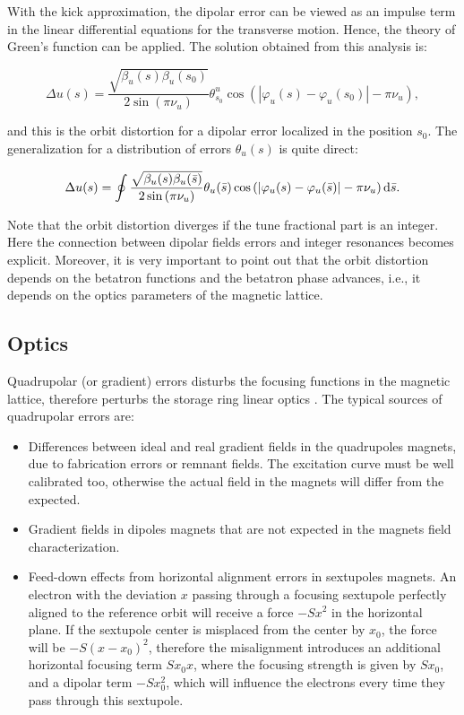 With the kick approximation, the dipolar error can be viewed as an impulse term in the linear differential equations for the transverse motion. Hence, the theory of Green's function can be applied. The solution obtained from this analysis is:

\begin{equation}
    \Delta u(s) = \dfrac{\sqrt{\beta_{u}(s)\beta_{u}(s_0)}}{2\sin\left(\pi\nu_{u}\right)} \theta_{s_0}^{u} \cos\left( |\varphi_{u}(s) - \varphi_{u}(s_0)| - \pi\nu_{u} \right),
\end{equation}

and this is the orbit distortion for a dipolar error localized in the position $s_0$. The generalization for a distribution of errors $\theta_u(s)$ is quite direct:

\begin{equation}
    \Delta u(s) = \oint \dfrac{\sqrt{\beta_{u}(s)\beta_{u}(\bar{s})}}{2\sin\left(\pi\nu_{u}\right)} \theta_{u}(\bar{s}) \cos\left( |\varphi_{u}(s) - \varphi_{u}(\bar{s})| - \pi\nu_{u} \right) \mathrm{d} \bar{s}.
\end{equation}

Note that the orbit distortion diverges if the tune fractional part is an integer. Here the connection between dipolar fields errors and integer resonances becomes explicit. Moreover, it is very important to point out that the orbit distortion depends on the betatron functions and the betatron phase advances, i.e., it depends on the optics parameters of the magnetic lattice.

\subsection{Optics}\label{subsec:optics}

Quadrupolar (or gradient) errors disturbs the focusing functions in the magnetic lattice, therefore perturbs the storage ring linear optics . The typical sources of quadrupolar errors are:

\begin{itemize}
    \item Differences between ideal and real gradient fields in the quadrupoles magnets, due to fabrication errors or remnant fields. The excitation curve must be well calibrated too, otherwise the actual field in the magnets will differ from the expected. 
    
    \item Gradient fields in dipoles magnets that are not expected in the magnets field characterization.
    
    \item Feed-down effects from horizontal alignment errors in sextupoles magnets. An electron with the deviation $x$ passing through a focusing sextupole perfectly aligned to the reference orbit will receive a force $-Sx^2$ in the horizontal plane. If the sextupole center is misplaced from the center by $x_0$, the force will be $-S(x - x_0)^2$, therefore the misalignment introduces an additional horizontal focusing term $ Sx_0 x$, where the focusing strength is given by $Sx_0$, and a dipolar term $-S x_0^2$, which will influence the electrons every time they pass through this sextupole.
\end{itemize}
 

